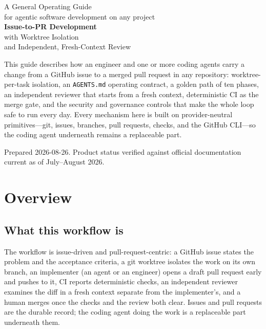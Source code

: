 \documentclass[11pt]{article}
\begin{document}
\begin{titlepage}
\centering
\vspace*{2.2cm}
{\color{gwGray}\large A General Operating Guide}\\[4pt]
{\color{gwGray}\normalsize for agentic software development on any project}\\[2.4cm]
{\Huge\bfseries\color{gwPrimary} Issue-to-PR Development}\\[10pt]
{\LARGE\color{gwInk} with Worktree Isolation}\\[6pt]
{\large\color{gwGray} and Independent, Fresh-Context Review}\\[2.4cm]

\begin{tcolorbox}[width=0.82\textwidth, colback=gwLeaf, colframe=gwPrimary,
   sharp corners, boxrule=0.7pt, halign=center]
\small This guide describes how an engineer and one or more coding agents carry a change from a
GitHub issue to a merged pull request in any repository: worktree-per-task isolation, an
\texttt{AGENTS.md} operating contract, a golden path of ten phases, an independent reviewer
that starts from a fresh context, deterministic CI as the merge gate, and the security and
governance controls that make the whole loop safe to run every day. Every mechanism here is
built on provider-neutral primitives---git, issues, branches, pull requests, checks, and the
GitHub CLI---so the coding agent underneath remains a replaceable part.
\end{tcolorbox}

\vfill
{\small\color{gwGray} Prepared 2026-08-26. Product status verified against official
documentation current as of July--August 2026.}
\end{titlepage}

{\hypersetup{linkcolor=gwInk}\tableofcontents\clearpage}

\section{Overview}

\subsection{What this workflow is}

The workflow is issue-driven and pull-request-centric: a GitHub issue states the problem and the
acceptance criteria, a git worktree isolates the work on its own branch, an implementer (an agent
or an engineer) opens a draft pull request early and pushes to it, CI reports deterministic
checks, an independent reviewer examines the diff in a fresh context separate from the
implementer's, and a human merges once the checks and the review both clear. Issues and pull
requests are the durable record; the coding agent doing the work is a replaceable part underneath
them.
\end{document}
